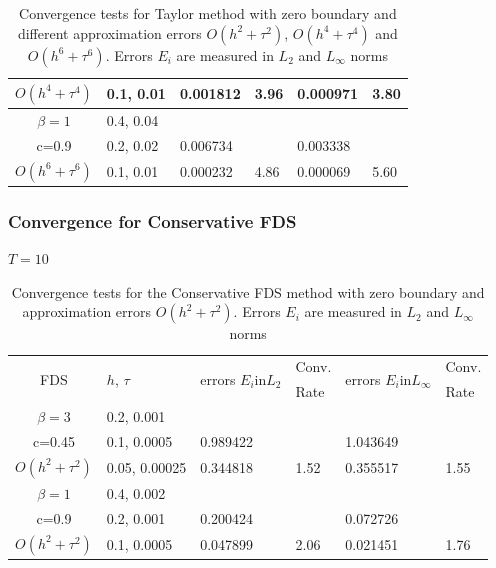 \documentclass{beamer}
\begin{document}
\begin{frame}
\begin{table}[ht]
{\begin{tabular}{||c|l|ll|ll||}
       $O(h^4+ \tau^4)$ &0.1, 0.01   &0.001812 & 3.96  & 0.000971  & 3.80  \\
    \hline
  $\beta=1$     &0.4, 0.04   &            &          &                  &      \\
      c=0.9                    &0.2, 0.02   &0.006734 &           & 0.003338      &       \\
     $O(h^6+ \tau^6)$ &0.1, 0.01 & 0.000232 &4.86 & 0.000069  & 5.60        \\
	   \hline
			\hline 
		\end{tabular}
		}%
		\caption{Convergence tests for Taylor method with zero boundary and different approximation errors $O(h^{2} + \tau^2 )$, $O(h^{4} + \tau^4 )$ and $O(h^{6} + \tau^6 )$. Errors $E_i$ are measured in $L_2$ and $L_\infty$ norms}
\label{table:A}
\end{table}

\end{frame}

\begin{frame}
\frametitle{Convergence for Conservative FDS}
$T = 10$
\begin{table}[ht]
\centering
\small
		\begin{tabular}{||c|l|ll|ll||}
			\hline
			\hline
      \multirow{2  }{*}{FDS}        & \multirow{2  }{*}{$h$, $\tau$}  & \multirow{2  }{*}{errors $E_i$in$L_2$}  &Conv.& \multirow{2  }{*}{errors $E_i$in$L_\infty$}  &Conv.  \\
	                                        &                                                     &                                                                 &  Rate &                                                                       & Rate \\
   			\hline 
					\hline 
  $\beta=3$                &0.2, 0.001         &                    &                &                  &                   \\
   c=0.45                     &0.1, 0.0005         & 0.989422   &                & 1.043649  &                   \\
     $O(h^2 + \tau^ 2)$ &0.05, 0.00025  &0.344818    & 1.52       & 0.355517   &   1.55   \\
	   \hline
			\hline 
       $\beta=1$           & 0.4, 0.002       &                   &           &                 &   \\
                  c=0.9       & 0.2, 0.001        & 0.200424   &          &0.072726  &   \\
  $O(h^2+ \tau^2)$  & 0.1, 0.0005       & 0.047899   & 2.06  &0.021451  & 1.76 \\
	   \hline
			\hline 
		\end{tabular}
		\caption{Convergence tests for the Conservative FDS method with zero boundary and approximation errors $O(h^{2} + \tau^2 )$. Errors $E_i$ are measured in $L_2$ and $L_\infty$ norms}
\label{tableC}
\end{table}

\end{frame}
\end{document}

